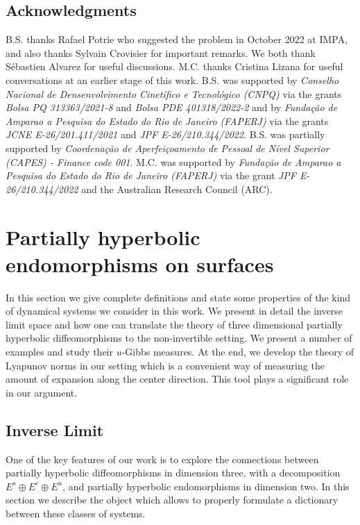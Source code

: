 \documentclass[a4paper,11pt,reqno]{amsart}
\theoremstyle{definition}
\begin{document}
\subsection*{Acknowledgments} B.S. thanks Rafael Potrie who suggested the problem in October 2022 at IMPA, and also thanks Sylvain Crovisier for important remarks. We both thank Sébastien Alvarez for useful discussions. M.C. thanks Cristina Lizana for useful conversations at an earlier stage of this work. B.S. was supported by \emph{Conselho Nacional de Densenvolvimento Cinetífico e Tecnológico (CNPQ)} via the grants \emph{Bolsa PQ 313363/2021-8} and \emph{Bolsa PDE 401318/2022-2} and by \emph{Fundação de Amparao a Pesquisa do Estado do Rio de Janeiro (FAPERJ)} via the grants \emph{JCNE E-26/201.411/2021} and \emph{JPF E-26/210.344/2022}. B.S. was partially supported by \emph{Coordenação de Aperfeiçoamento de Pessoal de Nível Superior (CAPES) - Finance code 001}. M.C. was supported by \emph{Fundação de Amparao a Pesquisa do Estado do Rio de Janeiro (FAPERJ)} via the grant \emph{JPF E-26/210.344/2022} and the Australian Research Council (ARC).

\section{Partially hyperbolic endomorphisms on surfaces}
\label{sec:ph-exp}

In this section we give complete definitions and state some properties of the kind of dynamical systems we consider in this work. We present in detail the inverse limit space and how one can translate the theory of three dimensional partially hyperbolic diffeomorphisms to the non-invertible setting. We present a number of examples and study their $u$-Gibbs measures. At the end, we develop the theory of Lyapunov norms in our setting which is a convenient way of measuring the amount of expansion along the center direction. This tool plays a significant role in our argument.

\subsection{Inverse Limit}
\label{sec:inv-lim}

One of the key features of our work is to explore the connections between partially hyperbolic diffeomorphisms in dimension three, with a decomposition $E^s\oplus E^c\oplus E^u$, and partially hyperbolic endomorphisms in dimension two. In this section we describe the object which allows to properly formulate a dictionary between these classes of systems.
\end{document}
